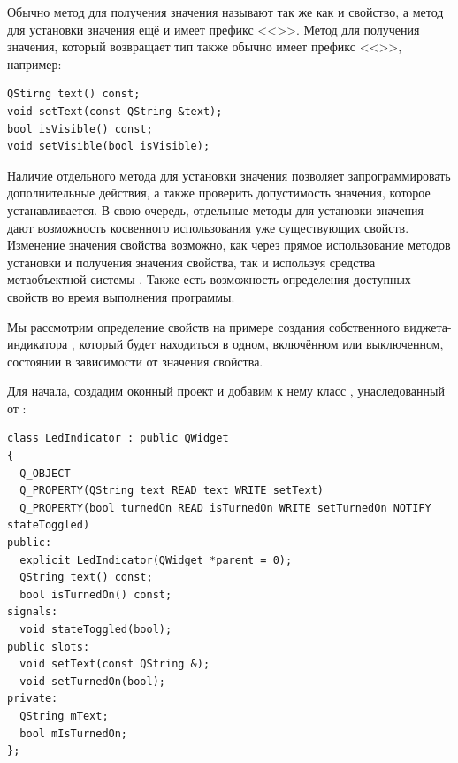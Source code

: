 Обычно метод для получения значения называют так же как и свойство, а метод для установки значения ещё и имеет префикс
<<>>. Метод для получения значения, который возвращает тип  также обычно имеет
префикс <<>>, например:
\begin{lstlisting}
QStirng text() const;
void setText(const QString &text);
bool isVisible() const;
void setVisible(bool isVisible);
\end{lstlisting}

Наличие отдельного метода для установки значения позволяет запрограммировать 
дополнительные действия, а также проверить
допустимость значения, которое устанавливается. В свою очередь, отдельные 
методы для установки значения дают
возможность косвенного использования уже существующих свойств. 
Изменение значения свойства возможно, как через прямое
использование методов установки и получения значения свойства, так и используя 
средства метаобъектной системы . Также
есть возможность определения доступных свойств во время выполнения программы.

Мы рассмотрим определение свойств на примере создания собственного 
виджета-индикатора ,
который будет находиться в одном, включённом или выключенном, состоянии 
в зависимости от значения свойства.

Для начала, создадим оконный проект и добавим к нему класс , унаследованный от
:
\begin{lstlisting}
class LedIndicator : public QWidget
{
  Q_OBJECT
  Q_PROPERTY(QString text READ text WRITE setText)
  Q_PROPERTY(bool turnedOn READ isTurnedOn WRITE setTurnedOn NOTIFY stateToggled)
public:
  explicit LedIndicator(QWidget *parent = 0);
  QString text() const;
  bool isTurnedOn() const;
signals:
  void stateToggled(bool);
public slots:
  void setText(const QString &);
  void setTurnedOn(bool);
private:
  QString mText;
  bool mIsTurnedOn;
};
\end{lstlisting}

